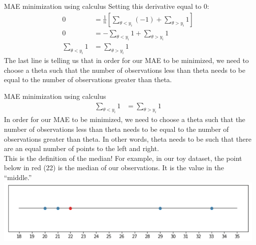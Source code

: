 \documentclass[aspectratio=169]{../latex_main/tntbeamer}  %
\begin{document}
	
	\begin{frame}{MAE minimization using calculus}
	    Setting this derivative equal to 0:
	    \begin{align*}
	        0 &= \frac{1}{n}[\sum\limits_{\theta < y_i} (-1) + \sum\limits_{\theta > y_i} 1 ]\\
	        0 &= - \sum\limits_{\theta < y_i} 1 + \sum\limits_{\theta > y_i} 1\\
	        \sum\limits_{\theta < y_i} 1 &= \sum\limits_{\theta > y_i} 1
	    \end{align*}
	    The last line is telling us that in order for our MAE to be minimized, we need to choose a theta such that the number of observations less than theta needs to be equal to the number of observations greater than theta.

	\end{frame}
	
	
	
	\begin{frame}{MAE minimization using calculus}
	    \begin{align*}
	        \sum\limits_{\theta < y_i} 1 &= \sum\limits_{\theta > y_i} 1
	    \end{align*}
	    In order for our MAE to be minimized, we need to choose a theta such that the number of observations less than theta needs to be equal to the number of observations greater than theta. In other words, theta needs to be such that there are an equal number of points to the left and right.\\
	    \bigskip
	    This is the definition of the median! For example, in our toy dataset, the point below in red (22) is the median of our observations. It is the value in the “middle.”\\
	    \hspace{4cm} \includegraphics[scale=.5]{Bild41}
	\end{frame}
	
\end{document}
